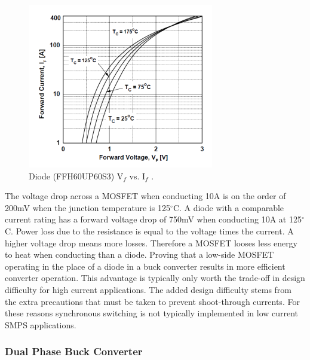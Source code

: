 \documentclass[11pt]{article}
\begin{document}
    \begin{figure}[H]
            \centering
            \includegraphics[width=0.5\linewidth]{diode.PNG}
            \caption{Diode (FFH60UP60S3) V$_f$ vs. I$_f$ \cite{on_semiconductor_ffh60up60s_2018}.}
            \label{diode}
        \end{figure}
    
    \noindent The voltage drop across a MOSFET when conducting 10A is on the order of 200mV when the junction temperature is 125$^{\circ}$C. A diode with a comparable current rating has a forward voltage drop of 750mV when conducting 10A at 125$^{\circ}$C. Power loss due to the resistance is equal to the voltage times the current. A higher voltage drop means more losses. Therefore a MOSFET looses less energy to heat when conducting than a diode. Proving that a low-side MOSFET operating in the place of a diode in a buck converter results in more efficient converter operation. This advantage is typically only worth the trade-off in design difficulty for high current applications. The added design difficulty stems from the extra precautions that must be taken to prevent shoot-through currents. For these reasons synchronous switching is not typically implemented in low current SMPS applications.
    
    \subsubsection{Dual Phase Buck Converter}
    
\end{document}
